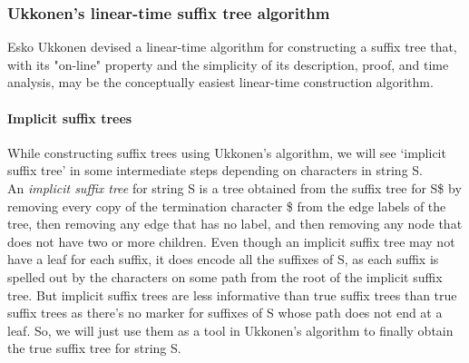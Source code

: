 \documentclass[11pt,a4paper]{article}
\begin{document}
\subsubsection{Ukkonen's linear-time suffix tree algorithm}
\label{subsec:ukknalgorithm}
Esko Ukkonen devised a linear-time algorithm for constructing a suffix tree that, with its "on-line" property and the simplicity of its description, proof, and time analysis, may be the conceptually easiest linear-time construction algorithm. 
\paragraph{Implicit suffix trees}
While constructing suffix trees using Ukkonen's algorithm, we will see `implicit suffix tree' in some intermediate steps depending on characters in string S.
\\
An \emph{implicit suffix tree} for string S is a tree obtained from the suffix tree for S\$ by removing every copy of the termination character \$ from the edge labels of the tree, then removing any edge that has no label, and then removing any node that does not have two or more children. Even though an implicit suffix tree may not have a leaf for each suffix, it does encode all the suffixes of S, as each suffix is spelled out by the characters on some path from the root of the implicit suffix tree. But implicit suffix trees are less informative than true suffix trees than true suffix trees as there's no marker for suffixes of S whose path does not end at a leaf. So, we will just use them as a tool in Ukkonen's algorithm to finally obtain the true suffix tree for string S.
\end{document}
